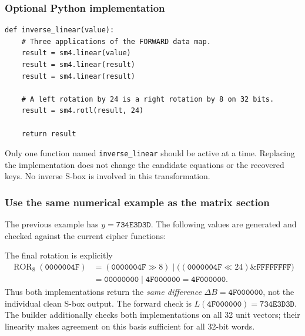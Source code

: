 \subsubsection*{Optional Python implementation}
\begin{Verbatim}
def inverse_linear(value):
    # Three applications of the FORWARD data map.
    result = sm4.linear(value)
    result = sm4.linear(result)
    result = sm4.linear(result)

    # A left rotation by 24 is a right rotation by 8 on 32 bits.
    result = sm4.rotl(result, 24)

    return result
\end{Verbatim}
Only one function named \texttt{inverse\_linear} should be active at a time.
Replacing the implementation does not change the candidate equations or the
recovered keys. No inverse S-box is involved in this transformation.

\subsubsection*{Use the same numerical example as the matrix section}
The previous example has $y=\texttt{734E3D3D}$. The following values are
generated and checked against the current cipher functions:


\begin{center}
\end{center}
The final rotation is explicitly
\[
\begin{aligned}
\operatorname{ROR}_8(\texttt{0000004F})
&=(\texttt{0000004F}\gg8)
\mathbin{|}\bigl((\texttt{0000004F}\ll24)\mathbin{\&}\texttt{FFFFFFFF}\bigr)\\
&=\texttt{00000000}\mathbin{|}\texttt{4F000000}
=\texttt{4F000000}.
\end{aligned}
\]
Thus both implementations return the \emph{same difference}
$\Delta B=\texttt{4F000000}$, not the individual clean S-box output.
The forward check is $L(\texttt{4F000000})=\texttt{734E3D3D}$.
The builder additionally checks both implementations on all 32 unit vectors;
their linearity makes agreement on this basis sufficient for all 32-bit words.

